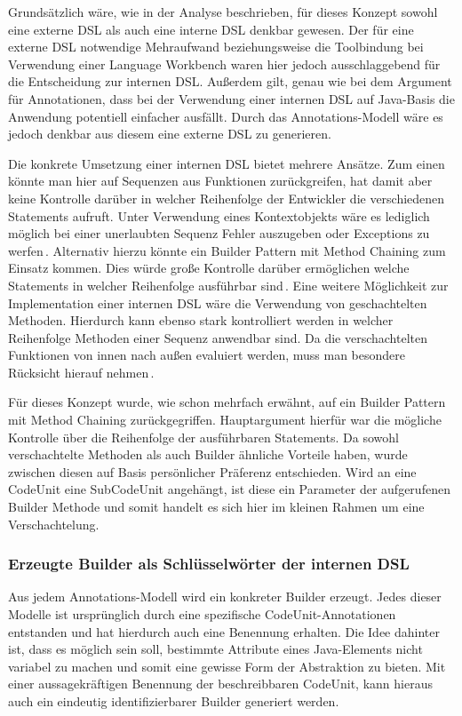 \documentclass[12pt,oneside,a4paper,parskip]{scrbook}
\begin{document}
Grundsätzlich wäre, wie in der Analyse beschrieben, für dieses Konzept sowohl eine externe DSL als auch eine interne DSL denkbar gewesen. Der für eine externe DSL notwendige Mehraufwand beziehungsweise die Toolbindung bei Verwendung einer Language Workbench waren hier jedoch ausschlaggebend für die Entscheidung zur internen DSL. Außerdem gilt, genau wie bei dem Argument für Annotationen, dass bei der Verwendung einer internen DSL auf Java-Basis die Anwendung potentiell einfacher ausfällt. Durch das Annotations-Modell wäre es jedoch denkbar aus diesem eine externe DSL zu generieren.

Die konkrete Umsetzung einer internen DSL bietet mehrere Ansätze. Zum einen könnte man hier auf Sequenzen aus Funktionen zurückgreifen, hat damit aber keine Kontrolle darüber in welcher Reihenfolge der Entwickler die verschiedenen Statements aufruft. Unter Verwendung eines Kontextobjekts wäre es lediglich möglich bei einer unerlaubten Sequenz Fehler auszugeben oder Exceptions zu werfen\,\cite[S. 351ff.]{fowler2010}. Alternativ hierzu könnte ein Builder Pattern mit Method Chaining zum Einsatz kommen. Dies würde große Kontrolle darüber ermöglichen welche Statements in welcher Reihenfolge ausführbar sind\,\cite[S. 343ff.]{fowler2010}. Eine weitere Möglichkeit zur Implementation einer internen DSL wäre die Verwendung von geschachtelten Methoden. Hierdurch kann ebenso stark kontrolliert werden in welcher Reihenfolge Methoden einer Sequenz anwendbar sind. Da die verschachtelten Funktionen von innen nach außen evaluiert werden, muss man besondere Rücksicht hierauf nehmen\,\cite[S. 357ff.]{fowler2010}.

Für dieses Konzept wurde, wie schon mehrfach erwähnt, auf ein Builder Pattern mit Method Chaining zurückgegriffen. Hauptargument hierfür war die mögliche Kontrolle über die Reihenfolge der ausführbaren Statements. Da sowohl verschachtelte Methoden als auch Builder ähnliche Vorteile haben, wurde zwischen diesen auf Basis persönlicher Präferenz entschieden. Wird an eine CodeUnit eine SubCodeUnit angehängt, ist diese ein Parameter der aufgerufenen Builder Methode und somit handelt es sich hier im kleinen Rahmen um eine Verschachtelung.

\subsubsection{Erzeugte Builder als Schlüsselwörter der internen DSL}

Aus jedem Annotations-Modell wird ein konkreter Builder erzeugt. Jedes dieser Modelle ist ursprünglich durch eine spezifische CodeUnit-Annotationen entstanden und hat hierdurch auch eine Benennung erhalten. Die Idee dahinter ist, dass es möglich sein soll, bestimmte Attribute eines Java-Elements nicht variabel zu machen und somit eine gewisse Form der Abstraktion zu bieten. Mit einer aussagekräftigen Benennung der beschreibbaren CodeUnit, kann hieraus auch ein eindeutig identifizierbarer Builder generiert werden.
\end{document}
